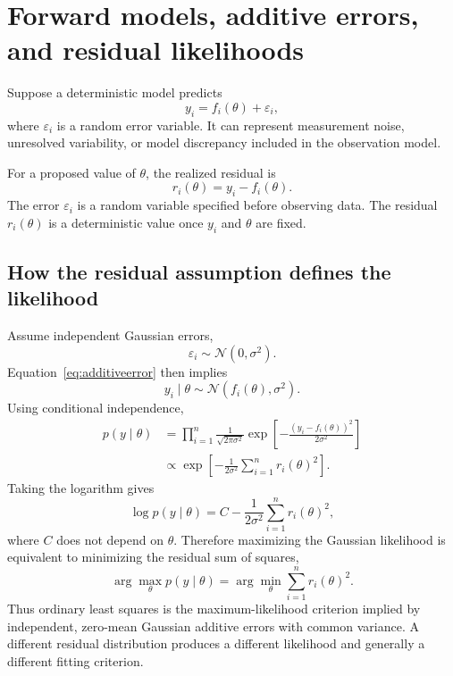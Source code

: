 \documentclass[11pt,a4paper]{article}
\begin{document}
\section{Forward models, additive errors, and residual likelihoods}
Suppose a deterministic model predicts
\begin{equation}
 y_i=f_i(\theta)+\varepsilon_i,
 \label{eq:additiveerror}
\end{equation}
where \(\varepsilon_i\) is a random error variable. It can represent measurement noise, unresolved variability, or model discrepancy included in the observation model.

For a proposed value of \(\theta\), the realized residual is
\begin{equation}
 r_i(\theta)=y_i-f_i(\theta).
 \label{eq:residual}
\end{equation}
The error \(\varepsilon_i\) is a random variable specified before observing data. The residual \(r_i(\theta)\) is a deterministic value once \(y_i\) and \(\theta\) are fixed.

\subsection{How the residual assumption defines the likelihood}
Assume independent Gaussian errors,
\begin{equation}
 \varepsilon_i\sim\mathcal N(0,\sigma^2).
\end{equation}
Equation~\eqref{eq:additiveerror} then implies
\begin{equation}
 y_i\mid\theta\sim\mathcal N(f_i(\theta),\sigma^2).
\end{equation}
Using conditional independence,
\begin{align}
 p(y\mid\theta)
 &=\prod_{i=1}^{n}
 \frac{1}{\sqrt{2\pi\sigma^2}}
 \exp\left[-\frac{(y_i-f_i(\theta))^2}{2\sigma^2}\right] \\
 &\propto
 \exp\left[-\frac{1}{2\sigma^2}
 \sum_{i=1}^{n}r_i(\theta)^2\right].
 \label{eq:gaussianreslik}
\end{align}
Taking the logarithm gives
\begin{equation}
 \log p(y\mid\theta)=C-\frac{1}{2\sigma^2}
 \sum_{i=1}^{n}r_i(\theta)^2,
\end{equation}
where \(C\) does not depend on \(\theta\). Therefore maximizing the Gaussian likelihood is equivalent to minimizing the residual sum of squares,
\begin{equation}
 \arg\max_\theta p(y\mid\theta)
 =\arg\min_\theta\sum_{i=1}^{n}r_i(\theta)^2.
 \label{eq:leastsquares}
\end{equation}
Thus ordinary least squares is the maximum-likelihood criterion implied by independent, zero-mean Gaussian additive errors with common variance. A different residual distribution produces a different likelihood and generally a different fitting criterion.
\end{document}
